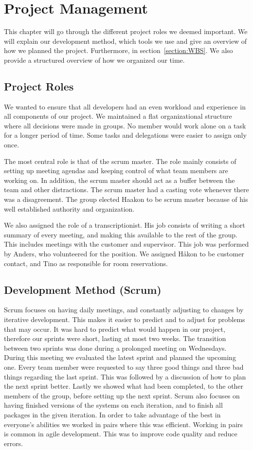 \chapter{Project Management}
This chapter will go through the different project roles we deemed
important. We will explain our development method, which tools we use
and give an overview of how we planned the project. Furthermore, in
section~\ref{section:WBS}. We also provide a structured overview of how we organized
our time. 

\section{Project Roles}
We wanted to ensure that all developers had an even workload and
experience in all components of our project. We
maintained a flat organizational structure where all decisions were
made in groups. No member would work alone on a task for a longer
period of time. Some tasks and delegations were easier to assign only once.

The most central role is that of the scrum master. The role mainly
consists of setting up meeting agendas and keeping control of what
team members are working on. In addition, the scrum master should act
as a buffer between the team and other distractions. The scrum master had a
casting vote whenever there was a disagreement. The group elected Haakon to be
scrum master because of his well established authority and organization.

We also assigned the role of a transcriptionist. His job consists of
writing a short summary of every meeting, and making this available to
the rest of the group. This includes meetings with the customer and
supervisor. This job was performed by Anders, who volunteered for the
position. We assigned Håkon to be customer contact, and
Tino as responsible for room reservations.

\section{Development Method (Scrum)}
Scrum focuses on having daily meetings, and constantly adjusting to
changes by iterative development. This makes it easier to predict and
to adjust for problems that may occur. It was hard to predict what
would happen in our project, therefore our sprints were short, lasting
at most two weeks. The transition between two sprints was done during a
prolonged meeting on Wednesdays. During this meeting we evaluated the
latest sprint and planned the upcoming one. Every team member were
requested to say three good things and three bad things regarding the
last sprint. This was followed by a discussion of how to plan the next
sprint better. Lastly we showed what had been completed, to the other
members of the group, before setting up the next sprint. Scrum also
focuses on having finished versions of the systems on each iteration,
and to finish all packages in the given iteration.
In order to take advantage of the best in everyone's
abilities we worked in pairs where this was efficient. Working in pairs
is common in agile development. This was to improve code quality and
reduce errors.

